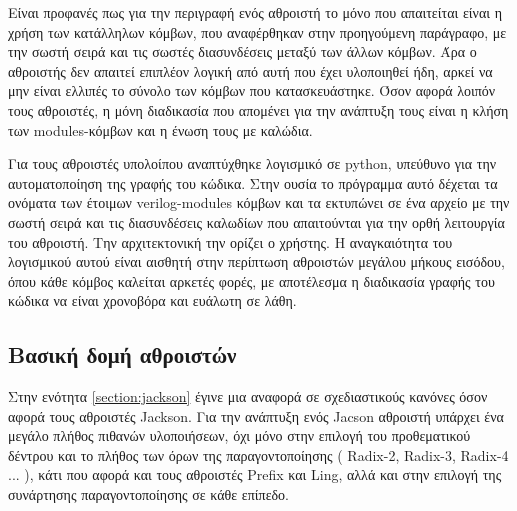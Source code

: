 

Είναι προφανές πως για την περιγραφή ενός αθροιστή το μόνο που απαιτείται είναι η χρήση των
κατάλληλων κόμβων, που αναφέρθηκαν στην προηγούμενη παράγραφο, με την σωστή σειρά και τις σωστές 
διασυνδέσεις μεταξύ των άλλων κόμβων. Άρα ο αθροιστής δεν απαιτεί επιπλέον λογική από αυτή που
έχει υλοποιηθεί ήδη, αρκεί να μην είναι ελλιπές το σύνολο των κόμβων που κατασκευάστηκε.
Όσον αφορά λοιπόν τους αθροιστές, η μόνη διαδικασία που απομένει για την ανάπτυξη τους είναι
η κλήση των modules-κόμβων και η ένωση τους με καλώδια. 

Για τους αθροιστές υπολοίπου αναπτύχθηκε λογισμικό σε python, υπεύθυνο για την αυτοματοποίηση της γραφής του κώδικα. Στην ουσία το πρόγραμμα αυτό δέχεται τα ονόματα των έτοιμων verilog-modules κόμβων και τα εκτυπώνει σε ένα αρχείο με την σωστή σειρά και τις διασυνδέσεις καλωδίων που απαιτούνται για την ορθή λειτουργία του αθροιστή. Την αρχιτεκτονική την ορίζει ο χρήστης. Η αναγκαιότητα του λογισμικού αυτού είναι αισθητή στην περίπτωση αθροιστών μεγάλου μήκους εισόδου, όπου κάθε κόμβος καλείται αρκετές φορές, με αποτέλεσμα η διαδικασία γραφής του κώδικα να είναι χρονοβόρα και ευάλωτη σε λάθη.



\subsection{Βασική δομή αθροιστών}

Στην ενότητα \ref{section:jackson} έγινε μια αναφορά σε σχεδιαστικούς κανόνες όσον αφορά τους 
αθροιστές Jackson. Για την ανάπτυξη ενός Jacson αθροιστή υπάρχει ένα μεγάλο πλήθος πιθανών υλοποιήσεων,
όχι μόνο στην επιλογή του προθεματικού δέντρου και το πλήθος των όρων της παραγοντοποίησης ( Radix-2, 
Radix-3, Radix-4 ... ), κάτι που αφορά και τους αθροιστές Prefix και Ling, αλλά 
και στην επιλογή της συνάρτησης παραγοντοποίησης σε κάθε επίπεδο.

